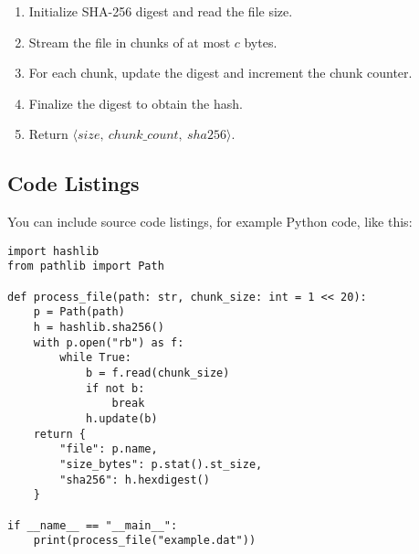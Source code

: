 \begin{enumerate}
    \item Initialize SHA-256 digest and read the file size.
    \item Stream the file in chunks of at most $c$ bytes.
    \item For each chunk, update the digest and increment the chunk counter.
    \item Finalize the digest to obtain the hash.
    \item Return $\langle size,\ chunk\_count,\ sha256 \rangle$.
\end{enumerate}

\subsection{Code Listings}

You can include source code listings, for example Python code, like this:

\begin{lstlisting}[float=htb, caption={Source code of the file processing algorithm.}, label={lst:filehash}]
import hashlib
from pathlib import Path

def process_file(path: str, chunk_size: int = 1 << 20):
    p = Path(path)
    h = hashlib.sha256()
    with p.open("rb") as f:
        while True:
            b = f.read(chunk_size)
            if not b:
                break
            h.update(b)
    return {
        "file": p.name,
        "size_bytes": p.stat().st_size,
        "sha256": h.hexdigest()
    }

if __name__ == "__main__":
    print(process_file("example.dat"))
\end{lstlisting}
